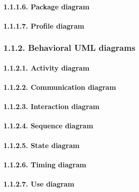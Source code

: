 \documentclass[]{article}
\let\oldparagraph\paragraph
\renewcommand{\paragraph}[1]{\oldparagraph{#1}\mbox{}}
\begin{document}
\paragraph{1.1.1.6. Package diagram}\label{package-diagram}

\paragraph{1.1.1.7. Profile diagram}\label{profile-diagram}

\subsubsection{1.1.2. Behavioral UML
diagrams}\label{behavioral-uml-diagrams}

\paragraph{1.1.2.1. Activity diagram}\label{activity-diagram}

\paragraph{1.1.2.2. Communication diagram}\label{communication-diagram}

\paragraph{1.1.2.3. Interaction diagram}\label{interaction-diagram}

\paragraph{1.1.2.4. Sequence diagram}\label{sequence-diagram}

\paragraph{1.1.2.5. State diagram}\label{state-diagram}

\paragraph{1.1.2.6. Timing diagram}\label{timing-diagram}

\paragraph{1.1.2.7. Use diagram}\label{use-diagram}
\end{document}
